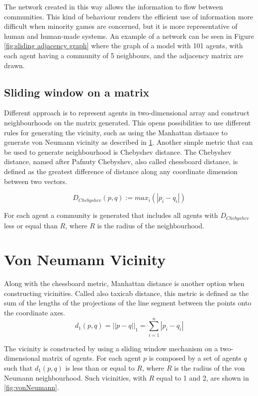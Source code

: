 The network created in this way allows the information to flow between communities.
This kind of behaviour renders the efficient use of information more difficult when minority games are concerned, but it is more representative of human and human-made systems.
An example of a network can be seen in Figure \ref{fig:sliding adjacency graph} where the graph of a model with 101 agents, with each agent having a community of 5 neighbours, and the adjacency matrix are drawn.

\subsection{Sliding window on a matrix}

Different approach is to represent agents in two-dimensional array and construct neighbourhoods on the matrix generated.
This opens possibilities to use different rules for generating the vicinity, such as using the Manhattan distance to generate von Neumann vicinity as described in \ref{sec:von neumann}.
Another simple metric that can be used to generate neighbourhood is Chebyshev distance.
The Chebyshev distance, named after Pafnuty Chebyshev, also called chessboard distance, is defined as the greatest difference of distance along any coordinate dimension between two vectors.

\begin{displaymath}
D_{Chebyshev}(p,q) := max_i (|p_i-q_i|) 
\end{displaymath}

For each agent a community is generated that includes all agents with $D_{Chebyshev}$ less or equal than $R$, where $R$ is the radius of the neighbourhood.



\section{Von Neumann Vicinity}
\label{sec:von neumann}

Along with the chessboard metric, Manhattan distance is another option when constructing vicinities.
Called also taxicab distance, this metric is defined as the sum of the lengths of the projections of the line segment between the points onto the coordinate axes.
\begin{displaymath}
d_1(p,q) = ||p-q||_1 = \sum_{i=1}^n |p_i - q_i|
\end{displaymath}

The vicinity is constructed by using a sliding window mechanism on a two-dimensional matrix of agents.
For each agent $p$ is composed by a set of agents $q$ such that $d_1(p,q)$ is less than or equal to $R$, where $R$ is the radius of the von Neumann neighbourhood.
Such vicinities, with $R$ equal to 1 and 2, are shown in \ref{fig:vonNeumann}.

